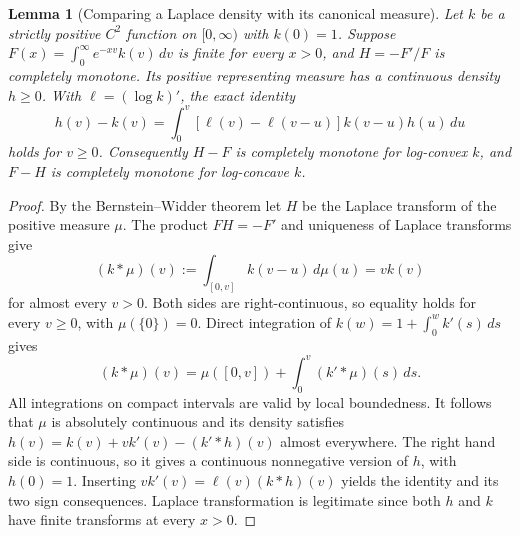 \documentclass[11pt,a4paper]{article}
\newtheorem{lemma}[theorem]{Lemma}
\numberwithin{equation}{section}
\begin{document}
\begin{lemma}[Comparing a Laplace density with its canonical measure]
\label{gqderiv:compare}
Let $k$ be a strictly positive $C^2$ function on $[0,\infty)$ with
$k(0)=1$. Suppose $F(x)=\int_0^\infty e^{-xv}k(v)\,dv$ is finite
for every $x>0$, and $H=-F'/F$ is completely monotone.
Its positive representing measure has a continuous density $h\ge0$.
With $\ell=(\log k)'$, the exact identity
\[
 h(v)-k(v)=\int_0^v
  [\ell(v)-\ell(v-u)]k(v-u)h(u)\,du
\]
holds for $v\ge0$. Consequently $H-F$ is completely monotone for
log-convex $k$, and $F-H$ is completely monotone for log-concave $k$.
\end{lemma}
\begin{proof}
By the Bernstein--Widder theorem let $H$ be the Laplace transform
of the positive measure $\mu$. The product $FH=-F'$ and uniqueness
of Laplace transforms give
\[
 (k*\mu)(v):=\int_{[0,v]} k(v-u)\,d\mu(u)=v k(v)
\]
for almost every $v>0$. Both sides are right-continuous, so equality
holds for every $v\ge0$, with $\mu(\{0\})=0$.
Direct integration of $k(w)=1+\int_0^w k'(s)\,ds$ gives
\[
 (k*\mu)(v)=\mu([0,v])+\int_0^v(k'*\mu)(s)\,ds.
\]
All integrations on compact intervals are valid by local boundedness.
It follows that $\mu$ is absolutely continuous and its density
satisfies $h(v)=k(v)+vk'(v)-(k'*h)(v)$ almost everywhere.
The right hand side is continuous, so it gives a continuous
nonnegative version of $h$, with $h(0)=1$. Inserting
$v k'(v)=\ell(v)(k*h)(v)$ yields the identity and its two sign
consequences. Laplace transformation is legitimate since both $h$
and $k$ have finite transforms at every $x>0$.
\end{proof}
\end{document}
